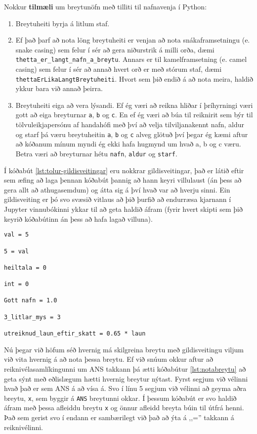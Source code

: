 Nokkur \textbf{tilmæli} um breytunöfn með tilliti til nafnavenja í Python:
\vspace{0.1cm}
\begin{enumerate}
	\item Breytuheiti byrja á litlum staf.
	\item Ef það þarf að nota löng breytuheiti er venjan að nota snákaframsetningu (e. snake casing) sem felur í sér að gera niðurstrik á milli orða, dæmi \texttt{thetta\_er\_langt\_nafn\_a\_breytu}.
	Annars er til kamelframsetning (e. camel casing) sem felur í sér að annað hvert orð er með stórum staf, dæmi \texttt{thettaErLikaLangtBreytuheiti}.
	Hvort sem þið endið á að nota meira, haldið ykkur bara við annað þeirra.
	\item Breytuheiti eiga að vera lýsandi.
	Ef ég væri að reikna hliðar í þríhyrningi væri gott að eiga breyturnar \texttt{a}, \texttt{b} og \texttt{c}.
	En ef ég væri að búa til reiknirit sem býr til tölvuleikjapersónu af handahófi með því að velja tilviljanakennt nafn, aldur og starf þá væru breytuheitin \texttt{a}, \texttt{b} og \texttt{c} alveg glötuð því þegar ég kæmi aftur að kóðanum mínum myndi ég ekki hafa hugmynd um hvað a, b og c væru. 
	Betra væri að breyturnar hétu \texttt{nafn}, \texttt{aldur} og \texttt{starf}.
\end{enumerate}
\vspace{0.3cm}

Í kóðabút \ref{lst:tolur-gildisveitingar} eru nokkrar gildisveitingar, það er látið eftir sem æfing að laga þennan kóðabút þannig að hann keyri villulaust (án þess að gera allt að athugasemdum) og átta sig á því hvað var að hverju sinni.
Ein gildisveiting er þó svo svæsið vitlaus að þið þurfið að endurræsa kjarnann í Jupyter vinnubókinni ykkar til að geta haldið áfram (fyrir hvert skipti sem þið keyrið kóðabútinn án þess að hafa lagað villuna).

\begin{lstlisting}[caption=Dæmi um gildisvetingar\, réttar og rangar, label=lst:tolur-gildisveitingar]
val = 5

5 = val

heiltala = 0

int = 0 

Gott nafn = 1.0

3_litlar_mys = 3

utreiknud_laun_eftir_skatt = 0.65 * laun
\end{lstlisting}

Nú þegar við höfum séð hvernig má skilgreina breytu með gildisveitingu viljum við vita hvernig á að nota þessa breytu.
Ef við snúum okkur aftur að reiknivélasamlíkingunni um ANS takkann þá ætti kóðabútur \ref{lst:notabreytu} að geta sýnt með eðlislægum hætti hvernig breytur nýtast.
Fyrst segjum við vélinni hvað það er sem ANS á að vísa á. 
Svo í línu 5 segjum við vélinni að geyma aðra breytu, \texttt{x}, sem byggir á \texttt{ANS} breytunni okkar.
Í þessum kóðabút er svo haldið áfram með þessa afleiddu breytu \texttt{x} og önnur afleidd breyta búin til útfrá henni.
Það sem gerist svo í endann er sambærilegt við það að ýta á ,,='' takkann á reiknivélinni.


